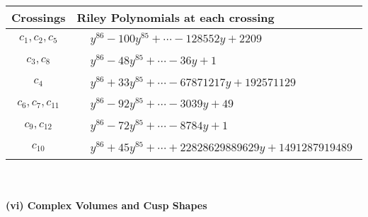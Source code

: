 \documentclass[1p]{elsarticle_modified}
\theoremstyle{definition}
\begin{document}
\begin{tabular}{m{50pt}|m{274pt}}
Crossings & \hspace{64pt}Riley Polynomials at each crossing \\
\hline $$\begin{aligned}c_{1},c_{2},c_{5}\end{aligned}$$&$\begin{aligned}
&y^{86}-100 y^{85}+\cdots-128552 y+2209
\end{aligned}$\\
\hline $$\begin{aligned}c_{3},c_{8}\end{aligned}$$&$\begin{aligned}
&y^{86}-48 y^{85}+\cdots-36 y+1
\end{aligned}$\\
\hline $$\begin{aligned}c_{4}\end{aligned}$$&$\begin{aligned}
&y^{86}+33 y^{85}+\cdots-67871217 y+192571129
\end{aligned}$\\
\hline $$\begin{aligned}c_{6},c_{7},c_{11}\end{aligned}$$&$\begin{aligned}
&y^{86}-92 y^{85}+\cdots-3039 y+49
\end{aligned}$\\
\hline $$\begin{aligned}c_{9},c_{12}\end{aligned}$$&$\begin{aligned}
&y^{86}-72 y^{85}+\cdots-8784 y+1
\end{aligned}$\\
\hline $$\begin{aligned}c_{10}\end{aligned}$$&$\begin{aligned}
&y^{86}+45 y^{85}+\cdots+22828629889629 y+1491287919489
\end{aligned}$\\
\hline
\end{tabular}\\~\\
\newpage\flushleft \textbf{(vi) Complex Volumes and Cusp Shapes}
\end{document}
